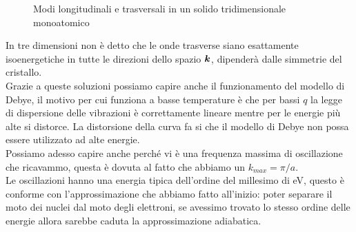 \begin{figure}[H]
    \centering
    \caption{Modi longitudinali e trasversali in un solido tridimensionale monoatomico}
    \label{fig:modi-longitudinali-e-trasversali-in-un-solido-tridimensionale-monoatomico}
\end{figure}
\noindent
In tre dimensioni non è detto che le onde trasverse siano esattamente isoenergetiche in tutte le direzioni dello spazio $\boldsymbol{k}$, dipenderà dalle simmetrie del cristallo. \\
Grazie a queste soluzioni possiamo capire anche il funzionamento del modello di Debye, il motivo per cui funziona a basse temperature è che per bassi $q$ la legge di dispersione delle vibrazioni è correttamente lineare mentre per le energie più alte si distorce. La distorsione della curva fa si che il modello di Debye non possa essere utilizzato ad alte energie. \\
Possiamo adesso capire anche perché vi è una frequenza massima di oscillazione che ricavammo, questa è dovuta al fatto che abbiamo un $k_{max} = \pi/a$.\\
Le oscillazioni hanno una energia tipica dell'ordine del millesimo di eV, questo è conforme con l'approssimazione che abbiamo fatto all'inizio: poter separare il moto dei nuclei dal moto degli elettroni, se avessimo trovato lo stesso ordine delle energie allora sarebbe caduta la approssimazione adiabatica.\\

